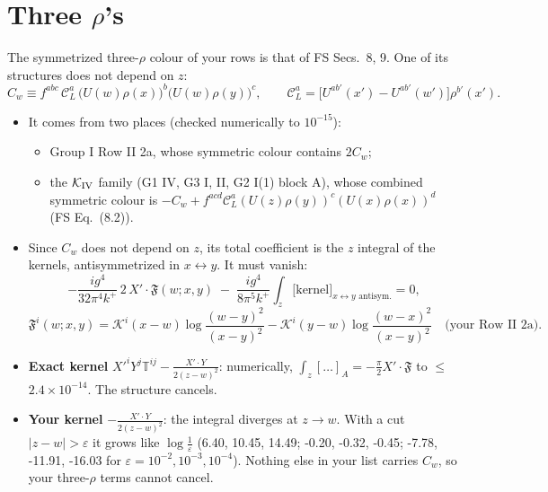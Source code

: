 \documentclass[10pt]{article}
\numberwithin{equation}{section}
\newcommand{\KK}{\mathcal K}
\newcommand{\CL}{\mathcal C_L}
\begin{document}
\section{Three \texorpdfstring{$\rho$}{rho}'s}\label{sec:three}
The symmetrized three-$\rho$ colour of your rows is that of FS Secs.~8, 9. One of its structures does not depend on $z$:
\begin{equation}
C_w\equiv f^{abc}\,\CL^a\,\big(U(w)\rho(x)\big)^b\big(U(w)\rho(y)\big)^c,\qquad \CL^a=\big[U^{ab'}(x')-U^{ab'}(w')\big]\rho^{b'}(x').
\end{equation}
\begin{itemize}
\item It comes from two places (checked numerically to $10^{-15}$):
\begin{itemize}
\item Group I Row II 2a, whose symmetric colour contains $2C_w$;
\item the $\KK_{\rm IV}$ family (G1 IV, G3 I, II, G2 I(1) block A), whose combined symmetric colour is $-C_w+f^{acd}\CL^a(U(z)\rho(y))^c(U(x)\rho(x))^d$ (FS Eq.~(8.2)).
\end{itemize}
\item Since $C_w$ does not depend on $z$, its total coefficient is the $z$ integral of the kernels, antisymmetrized in $x\leftrightarrow y$. It must vanish:
\begin{equation}
-\frac{ig^4}{32\pi^4k^+}\,2\,X'\!\cdot\mathfrak F(w;x,y)\;-\;\frac{ig^4}{8\pi^5k^+}\int_z\big[\text{kernel}\big]_{x\leftrightarrow y\text{ antisym.}}=0,
\end{equation}
\begin{equation*}
\mathfrak F^i(w;x,y)=\KK^i(x-w)\log\frac{(w-y)^2}{(x-y)^2}-\KK^i(y-w)\log\frac{(w-x)^2}{(x-y)^2}\quad\text{(your Row II 2a)}.
\end{equation*}
\item \textbf{Exact kernel} $X'^iY^j\mathbb T^{ij}-\frac{X'\cdot Y}{2(z-w)^2}$: numerically, $\int_z[\dots]_A=-\frac\pi2X'\!\cdot\mathfrak F$ to $\le$$2.4\times10^{-14}$. The structure cancels.
\item \textbf{Your kernel} $-\frac{X'\cdot Y}{2(z-w)^2}$: the integral diverges at $z\to w$. With a cut $|z-w|>\varepsilon$ it grows like $\log\frac1\varepsilon$ (6.40, 10.45, 14.49; -0.20, -0.32, -0.45; -7.78, -11.91, -16.03 for $\varepsilon=10^{-2},10^{-3},10^{-4}$). Nothing else in your list carries $C_w$, so your three-$\rho$ terms cannot cancel.
\end{itemize}
\end{document}
